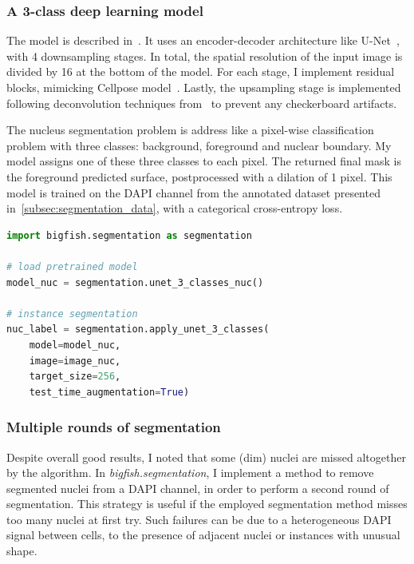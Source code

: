 \subsubsection{A 3-class deep learning model}

The model is described in~\cite{Imbert_fq_2022}.
It uses an encoder-decoder architecture like U-Net~\cite{Ronneberger_2015}, with 4 downsampling stages.
In total, the spatial resolution of the input image is divided by 16 at the bottom of the model.
For each stage, I implement residual blocks, mimicking Cellpose model~\cite{stringer_cellpose_2021}.
Lastly, the upsampling stage is implemented following deconvolution techniques from~\cite{odena2016deconvolution} to prevent any checkerboard artifacts.

The nucleus segmentation problem is address like a pixel-wise classification problem with three classes: background, foreground and nuclear boundary.
My model assigns one of these three classes to each pixel.
The returned final mask is the foreground predicted surface, postprocessed with a dilation of 1 pixel.
This model is trained on the DAPI channel from the annotated dataset presented in~\ref{subsec:segmentation_data}, with a categorical cross-entropy loss.\\

\begin{minipage}{0.9\textwidth}
\begin{lstlisting}[language=Python]
import bigfish.segmentation as segmentation

# load pretrained model
model_nuc = segmentation.unet_3_classes_nuc()

# instance segmentation
nuc_label = segmentation.apply_unet_3_classes(
    model=model_nuc,
	image=image_nuc,
	target_size=256,
	test_time_augmentation=True)
\end{lstlisting}
\end{minipage}

\subsubsection{Multiple rounds of segmentation}

Despite overall good results, I noted that some (dim) nuclei are missed altogether by the algorithm.
In \emph{bigfish.segmentation}, I implement a method to remove segmented nuclei from a DAPI channel, in order to perform a second round of segmentation.
This strategy is useful if the employed segmentation method misses too many nuclei at first try.
Such failures can be due to a heterogeneous DAPI signal between cells, to the presence of adjacent nuclei or instances with unusual shape.

